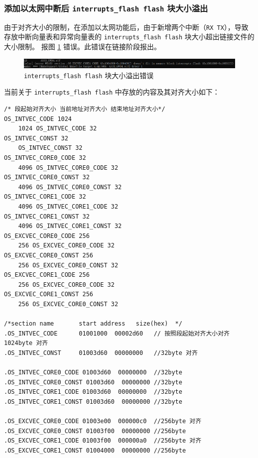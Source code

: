 \subsubsection{添加以太网中断后 \lstinline{interrupts_flash flash} 块大小溢出}\label{subsec:eth_ld_interrupts_flash_overflow_error}

由于对齐大小的限制，在添加以太网功能后，由于新增两个中断（\lstinline{RX TX}），导致存放中断向量表和异常向量表的 \lstinline{interrupts_flash flash} 块大小超出链接文件的大小限制。
报图 \ref{fig:eth_ld_error_interrupts_flash_overflow} 错误。此错误在链接阶段报出。

\begin{figure}[htbp]
    \centering
    \includegraphics[scale=0.6]{pic/eth_ld_error_interrupts_flash_overflow.png}
    \caption{\lstinline{interrupts_flash flash} 块大小溢出错误}
    \label{fig:eth_ld_error_interrupts_flash_overflow}
\end{figure}

当前关于 \lstinline{interrupts_flash flash} 中存放的内容及其对齐大小如下：

\begin{lstlisting}
/* 段起始对齐大小 当前地址对齐大小 结束地址对齐大小*/
OS_INTVEC_CODE 1024
	1024 OS_INTVEC_CODE 32
OS_INTVEC_CONST 32
	OS_INTVEC_CONST 32
OS_INTVEC_CORE0_CODE 32
	4096 OS_INTVEC_CORE0_CODE 32
OS_INTVEC_CORE0_CONST 32
	4096 OS_INTVEC_CORE0_CONST 32
OS_INTVEC_CORE1_CODE 32
	4096 OS_INTVEC_CORE1_CODE 32
OS_INTVEC_CORE1_CONST 32
	4096 OS_INTVEC_CORE1_CONST 32
OS_EXCVEC_CORE0_CODE 256
	256 OS_EXCVEC_CORE0_CODE 32
OS_EXCVEC_CORE0_CONST 256
	256 OS_EXCVEC_CORE0_CONST 32	
OS_EXCVEC_CORE1_CODE 256
	256 OS_EXCVEC_CORE0_CODE 32
OS_EXCVEC_CORE1_CONST 256
	256 OS_EXCVEC_CORE0_CONST 32	

/*section name       start address   size(hex)  */
.OS_INTVEC_CODE      01001000  00002d60   // 按照段起始对齐大小对齐 1024byte 对齐
.OS_INTVEC_CONST     01003d60  00000000   //32byte 对齐

.OS_INTVEC_CORE0_CODE 01003d60  00000000  //32byte
.OS_INTVEC_CORE0_CONST 01003d60  00000000 //32byte
.OS_INTVEC_CORE1_CODE 01003d60  00000000  //32byte
.OS_INTVEC_CORE1_CONST 01003d60  00000000 //32byte
  
.OS_EXCVEC_CORE0_CODE 01003e00  000000c0  //256byte 对齐
.OS_EXCVEC_CORE0_CONST 01003f00  00000000 //256byte
.OS_EXCVEC_CORE1_CODE 01003f00  000000a0  //256byte 对齐
.OS_EXCVEC_CORE1_CONST 01004000  00000000 //256byte
\end{lstlisting}

